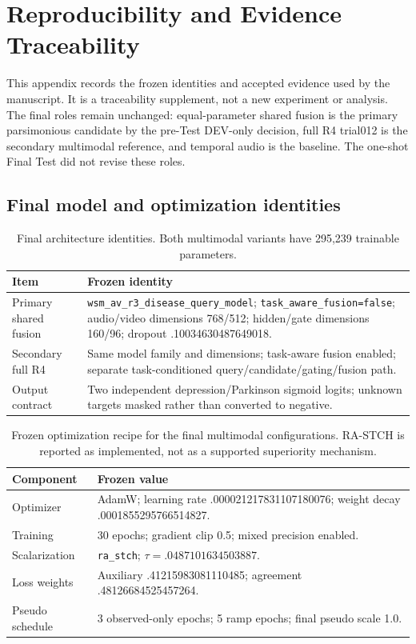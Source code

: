 \clearpage
\appendix
\section{Reproducibility and Evidence Traceability}
\label{app:reproducibility}

This appendix records the frozen identities and accepted evidence used by the manuscript. It is a traceability supplement, not a new experiment or analysis. The final roles remain unchanged: equal-parameter shared fusion is the primary parsimonious candidate by the pre-Test DEV-only decision, full R4 trial012 is the secondary multimodal reference, and temporal audio is the baseline. The one-shot Final Test did not revise these roles.

\subsection{Final model and optimization identities}

\begin{table}[t]
\centering\scriptsize
\caption{Final architecture identities. Both multimodal variants have 295,239 trainable parameters.}
\label{tab:app-architecture}
\begin{tabular}{@{}p{}p{}@{}}
\toprule
Item & Frozen identity\\
\midrule
Primary shared fusion & \texttt{wsm\_av\_r3\_disease\_query\_model}; \texttt{task\_aware\_fusion=false}; audio/video dimensions 768/512; hidden/gate dimensions 160/96; dropout .10034630487649018.\\
Secondary full R4 & Same model family and dimensions; task-aware fusion enabled; separate task-conditioned query/candidate/gating/fusion path.\\
Output contract & Two independent depression/Parkinson sigmoid logits; unknown targets masked rather than converted to negative.\\
\bottomrule
\end{tabular}
\end{table}

\begin{table}[t]
\centering\scriptsize
\caption{Frozen optimization recipe for the final multimodal configurations. RA-STCH is reported as implemented, not as a supported superiority mechanism.}
\label{tab:app-optimization}
\begin{tabular}{@{}p{}p{}@{}}
\toprule
Component & Frozen value\\
\midrule
Optimizer & AdamW; learning rate .000021217831107180076; weight decay .0001855295766514827.\\
Training & 30 epochs; gradient clip 0.5; mixed precision enabled.\\
Scalarization & \texttt{ra\_stch}; $\tau=.0487101634503887$.\\
Loss weights & Auxiliary .41215983081110485; agreement .48126684525457264.\\
Pseudo schedule & 3 observed-only epochs; 5 ramp epochs; final pseudo scale 1.0.\\
\bottomrule
\end{tabular}
\end{table}

